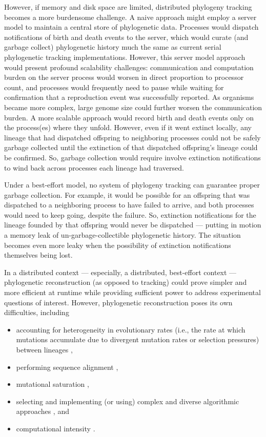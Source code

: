 However, if memory and disk space are limited, distributed phylogeny tracking becomes a more burdensome challenge.
A naive approach might employ a server model to maintain a central store of phylogenetic data.
Processes would dispatch notifications of birth and death events to the server, which would curate (and garbage collect) phylogenetic history much the same as current serial phylogenetic tracking implementations.
However, this server model approach would present profound scalability challenges: communication and computation burden on the server process would worsen in direct proportion to processor count, and processes would frequently need to pause while waiting for confirmation that a reproduction event was successfully reported.
As organisms became more complex, large genome size could further worsen the communication burden.
A more scalable approach would record birth and death events only on the process(es) where they unfold.
However, even if it went extinct locally, any lineage that had dispatched offspring to neighboring processes could not be safely garbage collected until the extinction of that dispatched offspring's lineage could be confirmed.
So, garbage collection would require involve extinction notifications to wind back across processes each lineage had traversed.


Under a best-effort model, no system of phylogeny tracking can guarantee proper garbage collection.
For example, it would be possible for an offspring that was dispatched to a neighboring process to have failed to arrive, and both processes would need to keep going, despite the failure.
So, extinction notifications for the lineage founded by that offspring would never be dispatched --- putting in motion a memory leak of un-garbage-collectible phylogenetic history.
The situation becomes even more leaky when the possibility of extinction notifications themselves being lost.

In a distributed context --- especially, a distributed, best-effort context --- phylogenetic reconstruction (as opposed to tracking) could prove simpler and more efficient at runtime while providing sufficient power to address experimental questions of interest.
However, phylogenetic reconstruction poses its own difficulties, including
\begin{itemize}
\item accounting for heterogeneity in evolutionary rates (i.e., the rate at which mutations accumulate due to divergent mutation rates or selection pressures) between lineages \citep{lack2010identifying},
\item performing sequence alignment \citep{casci2008lining},
\item mutational saturation \citep{hagstrom2004using},
\item selecting and implementing (or using) complex and diverse algorithmic approaches \citep{kapli2020phylogenetic}, and
\item computational intensity \citep{sarkar2010hardware}.
\end{itemize}

